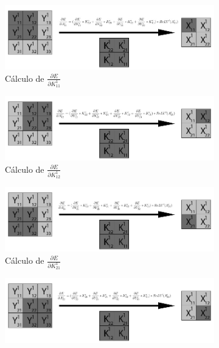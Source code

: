 \begin{figure}[H]
	\centering
	\begin{subfigure}{.5\textwidth}
		\hspace{-25mm}
		\includegraphics[width=1.4\linewidth]{imagenes/conv_back_entrada_pad_1.jpg}  
		\caption{Cálculo de $\frac{\partial E}{\partial K^1_{11}}$}
	\end{subfigure}%
	\begin{subfigure}{.5\textwidth}
		\hspace{5mm}
		\includegraphics[width=1.4\linewidth]{imagenes/conv_back_entrada_pad_2.jpg}  
		\caption{Cálculo de $\frac{\partial E}{\partial K^1_{12}}$}
	\end{subfigure}
	\vspace{5mm}
	\begin{subfigure}{.5\textwidth}
		\hspace{-25mm}
		\includegraphics[width=1.4\linewidth]{imagenes/conv_back_entrada_pad_3.jpg}  
		\caption{Cálculo de $\frac{\partial E}{\partial K^1_{21}}$}
	\end{subfigure}%
	\begin{subfigure}{.5\textwidth}
		\hspace{5mm}
		\includegraphics[width=1.4\linewidth]{imagenes/conv_back_entrada_pad_4.jpg}  

\end{subfigure}
\end{figure}
